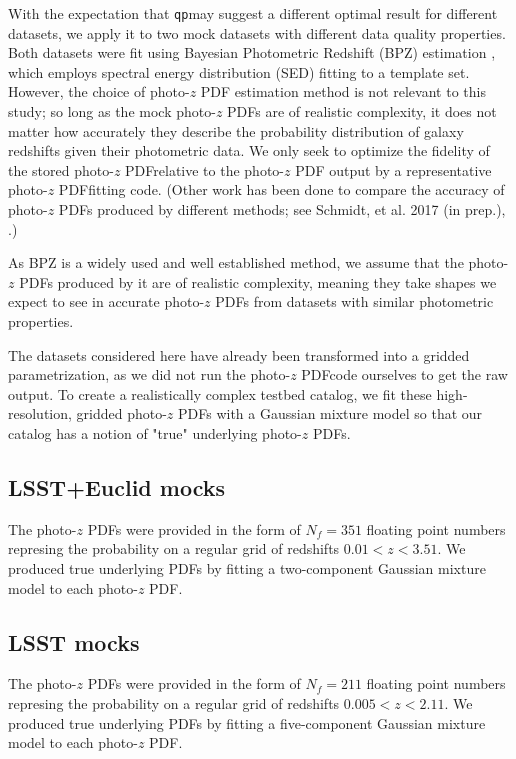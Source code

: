 \documentclass[\docopts]{\docclass}
\newcommand{\qp}{\texttt{qp}}
\newcommand{\pz}{photo-$z$ PDF}
\begin{document}
With the expectation that \qp may suggest a different optimal result for 
different datasets, we apply it to two mock datasets with different data 
quality properties.  Both datasets were fit using Bayesian Photometric Redshift 
(BPZ) estimation \citep{benitez_bayesian_2000}, which employs spectral energy 
distribution (SED) fitting to a template set.  However, the choice of \pz  
estimation method is not relevant to this study; so long as the mock \pz s are 
of realistic complexity, it does not matter how accurately they describe the 
probability distribution of galaxy redshifts given their photometric data.  We 
only seek to optimize the fidelity of the stored \pz  relative to the \pz  
output by a representative \pz  fitting code.  (Other work has been done to 
compare the accuracy of \pz s produced by different methods; see Schmidt, et 
al. 2017 (in prep.), \citet{tanaka_photometric_2017}.)

As BPZ is a widely used and well established method, we assume that the \pz s 
produced by it are of realistic complexity, meaning they take shapes we expect 
to see in accurate \pz s from datasets with similar photometric properties.

The datasets considered here have already been transformed into a gridded 
parametrization, as we did not run the \pz  code ourselves to get the raw 
output.  To create a realistically complex testbed catalog, we fit these 
high-resolution, gridded \pz s with a Gaussian mixture model so that our 
catalog has a notion of "true" underlying \pz s.

\subsection{LSST+Euclid mocks}
\label{sec:mg}


The \pz s were provided in the form of $N_{f}=351$ floating point numbers 
represing the probability on a regular grid of redshifts $0.01 < z < 3.51$.  We 
produced true underlying PDFs by fitting a two-component Gaussian mixture model 
to each \pz .

\subsection{LSST mocks}
\label{sec:ss}


The \pz s were provided in the form of $N_{f}=211$ floating point numbers 
represing the probability on a regular grid of redshifts $0.005 < z < 2.11$.  
We produced true underlying PDFs by fitting a five-component Gaussian mixture 
model to each \pz .
\end{document}
